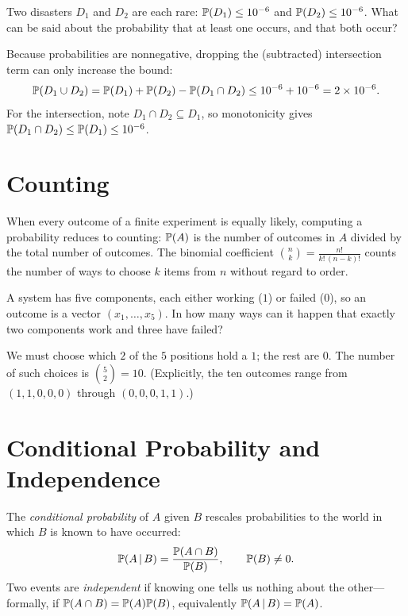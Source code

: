 \begin{example}
Two disasters $D_1$ and $D_2$ are each rare: $\mathbb{P}(D_1)\le 10^{-6}$ and
$\mathbb{P}(D_2)\le 10^{-6}$. What can be said about the probability that at least
one occurs, and that both occur?

\solution Because probabilities are nonnegative, dropping the (subtracted)
intersection term can only increase the bound:
\[
  \mathbb{P}(D_1\cup D_2)=\mathbb{P}(D_1)+\mathbb{P}(D_2)-\mathbb{P}(D_1\cap D_2)
   \le 10^{-6}+10^{-6}=2\times10^{-6}.
\]
For the intersection, note $D_1\cap D_2\subseteq D_1$, so monotonicity gives
$\mathbb{P}(D_1\cap D_2)\le\mathbb{P}(D_1)\le 10^{-6}$.
\end{example}

\section{Counting}

When every outcome of a finite experiment is equally likely, computing a
probability reduces to counting: $\mathbb{P}(A)$ is the number of outcomes in $A$
divided by the total number of outcomes. The binomial coefficient
$\binom{n}{k}=\frac{n!}{k!\,(n-k)!}$ counts the number of ways to choose $k$
items from $n$ without regard to order.

\begin{example}
A system has five components, each either working ($1$) or failed ($0$), so an
outcome is a vector $(x_1,\dots,x_5)$. In how many ways can it happen that
exactly two components work and three have failed?

\solution We must choose which $2$ of the $5$ positions hold a $1$; the rest are
$0$. The number of such choices is $\binom{5}{2}=10$. (Explicitly, the ten
outcomes range from $(1,1,0,0,0)$ through $(0,0,0,1,1)$.)
\end{example}

\section{Conditional Probability and Independence}

The \emph{conditional probability} of $A$ given $B$ rescales probabilities to
the world in which $B$ is known to have occurred:
\[
  \mathbb{P}(A\,|\, B)=\frac{\mathbb{P}(A\cap B)}{\mathbb{P}(B)},\qquad \mathbb{P}(B)\neq 0.
\]
Two events are \emph{independent} if knowing one tells us nothing about the
other—formally, if $\mathbb{P}(A\cap B)=\mathbb{P}(A)\mathbb{P}(B)$, equivalently
$\mathbb{P}(A\,|\, B)=\mathbb{P}(A)$.

